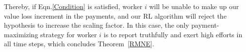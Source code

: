 Thereby, if Eqn.\ref{Condition} is satisfied, worker $i$ will be unable to make up our value loss increment in the payments, and our RL algorithm will reject the hypothesis to increase the scaling factor.
In this case, the only payment-maximizing strategy for worker $i$ is to report truthfully and exert high efforts in all time steps, which concludes Theorem~\ref{RMNE}.

%
%
%
%
